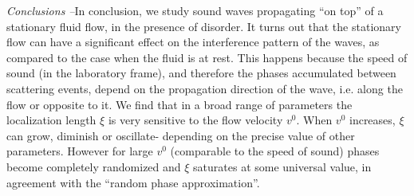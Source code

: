 \documentclass[aps,prl,twocolumn,groupedaddress,amsmath,amssymb]{revtex4}
\begin{document}
{\it Conclusions --}In conclusion, we study sound waves propagating ``on top'' of a  
stationary fluid flow, in the presence of disorder. It turns out that  
the stationary flow can have a significant effect on the interference  
pattern of the waves, as compared to the case when the fluid is at  
rest. This happens because the speed of sound (in the laboratory  
frame), and therefore the phases accumulated between scattering  
events,  depend on the propagation direction of the wave, i.e.  along  
the flow or opposite to it.  We find that in a broad range of  
parameters the localization length $\xi$ is very sensitive to the  flow  
velocity $v^0$. When $v^0$ increases, $\xi$ can grow, diminish or oscillate-  
depending on the precise value of other parameters. However for large  
$v^0$ (comparable to the speed of sound) phases become completely  
randomized and $\xi$ saturates at some universal value, in agreement with  
the ``random phase approximation''.

\begin{acknowledgments}

\end{acknowledgments}
\end{document}
